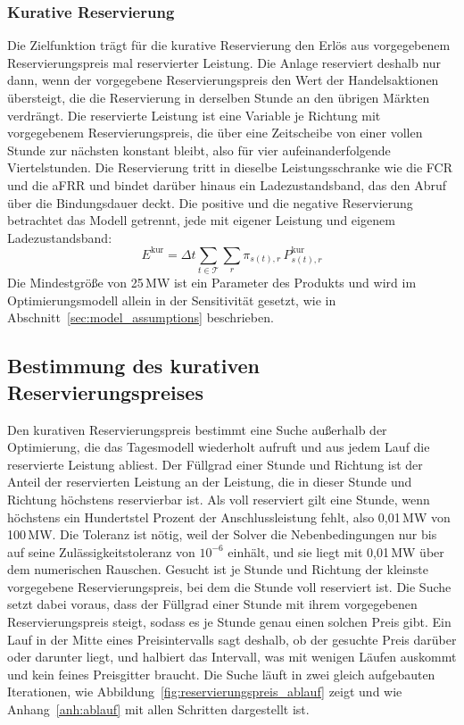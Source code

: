 \subsubsection*{Kurative Reservierung}
Die Zielfunktion trägt für die kurative Reservierung den Erlös aus vorgegebenem Reservierungspreis mal reservierter Leistung.
Die Anlage reserviert deshalb nur dann, wenn der vorgegebene Reservierungspreis den Wert der Handelsaktionen übersteigt, die die Reservierung in derselben Stunde an den übrigen Märkten verdrängt.
Die reservierte Leistung ist eine Variable je Richtung mit vorgegebenem Reservierungspreis, die über eine Zeitscheibe von einer vollen Stunde zur nächsten konstant bleibt, also für vier aufeinanderfolgende Viertelstunden.
Die Reservierung tritt in dieselbe Leistungsschranke wie die \ac{FCR} und die \ac{aFRR} und bindet darüber hinaus ein Ladezustandsband, das den Abruf über die Bindungsdauer deckt.
Die positive und die negative Reservierung betrachtet das Modell getrennt, jede mit eigener Leistung und eigenem Ladezustandsband:
\begin{equation}
    \label{eq:erloes_kur}
    E^{\mathrm{kur}} = \Delta t \sum_{t \in \mathcal{T}} \sum_{r} \pi_{s(t),r} \, P^{\mathrm{kur}}_{s(t),r}
\end{equation}
Die Mindestgröße von 25\,\si{MW} ist ein Parameter des Produkts und wird im Optimierungsmodell allein in der Sensitivität gesetzt, wie in Abschnitt~\ref{sec:model_assumptions} beschrieben.

\label{sec:model_scope_verification}

\subsection{Bestimmung des kurativen Reservierungspreises}
\label{sec:reservation_price_search}
\label{sec:weber_exclusion}

Den kurativen Reservierungspreis bestimmt eine Suche außerhalb der Optimierung, die das Tagesmodell wiederholt aufruft und aus jedem Lauf die reservierte Leistung abliest.
Der Füllgrad einer Stunde und Richtung ist der Anteil der reservierten Leistung an der Leistung, die in dieser Stunde und Richtung höchstens reservierbar ist.
Als voll reserviert gilt eine Stunde, wenn höchstens ein Hundertstel Prozent der Anschlussleistung fehlt, also 0,01\,\si{MW} von 100\,\si{MW}.
Die Toleranz ist nötig, weil der Solver die Nebenbedingungen nur bis auf seine Zulässigkeitstoleranz von $10^{-6}$ einhält, und sie liegt mit 0,01\,\si{MW} über dem numerischen Rauschen.
Gesucht ist je Stunde und Richtung der kleinste vorgegebene Reservierungspreis, bei dem die Stunde voll reserviert ist.
Die Suche setzt dabei voraus, dass der Füllgrad einer Stunde mit ihrem vorgegebenen Reservierungspreis steigt, sodass es je Stunde genau einen solchen Preis gibt.
Ein Lauf in der Mitte eines Preisintervalls sagt deshalb, ob der gesuchte Preis darüber oder darunter liegt, und halbiert das Intervall, was mit wenigen Läufen auskommt und kein feines Preisgitter braucht.
Die Suche läuft in zwei gleich aufgebauten Iterationen, wie Abbildung~\ref{fig:reservierungspreis_ablauf} zeigt und wie Anhang~\ref{anh:ablauf} mit allen Schritten dargestellt ist.

